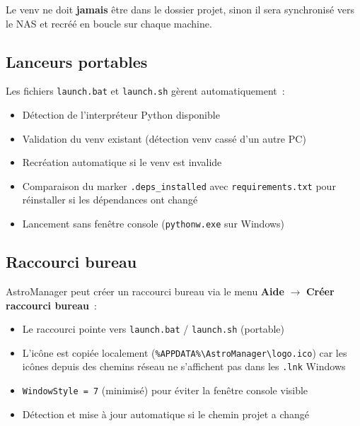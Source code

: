 \documentclass[a4paper,11pt]{article}
\begin{document}
\begin{warningbox}
Le venv ne doit \textbf{jamais} \^{e}tre dans le dossier projet, sinon il sera synchronis\'{e} vers le NAS et recr\'{e}\'{e} en boucle sur chaque machine.
\end{warningbox}

\subsection{Lanceurs portables}

Les fichiers \texttt{launch.bat} et \texttt{launch.sh} g\`{e}rent automatiquement~:

\begin{itemize}
    \item D\'{e}tection de l'interpr\'{e}teur Python disponible
    \item Validation du venv existant (d\'{e}tection venv cass\'{e} d'un autre PC)
    \item Recr\'{e}ation automatique si le venv est invalide
    \item Comparaison du marker \texttt{.deps\_installed} avec \texttt{requirements.txt} pour r\'{e}installer si les d\'{e}pendances ont chang\'{e}
    \item Lancement sans fen\^{e}tre console (\texttt{pythonw.exe} sur Windows)
\end{itemize}

\subsection{Raccourci bureau}

AstroManager peut cr\'{e}er un raccourci bureau via le menu \textbf{Aide} $\rightarrow$ \textbf{Cr\'{e}er raccourci bureau}~:

\begin{itemize}
    \item Le raccourci pointe vers \texttt{launch.bat} / \texttt{launch.sh} (portable)
    \item L'ic\^{o}ne est copi\'{e}e localement (\texttt{\%APPDATA\%\textbackslash AstroManager\textbackslash logo.ico}) car les ic\^{o}nes depuis des chemins r\'{e}seau ne s'affichent pas dans les \texttt{.lnk} Windows
    \item \texttt{WindowStyle = 7} (minimis\'{e}) pour \'{e}viter la fen\^{e}tre console visible
    \item D\'{e}tection et mise \`{a} jour automatique si le chemin projet a chang\'{e}
\end{itemize}
\end{document}
